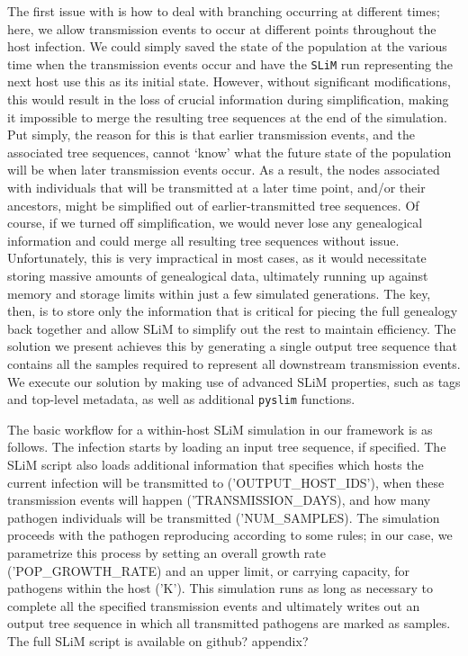 \documentclass[12pt]{article}
\newcommand{\slim}[0]{\texttt{SLiM}\xspace}
\newcommand{\pyslim}[0]{\texttt{pyslim}\xspace}
\begin{document}
The first issue with is how to deal with branching occurring at different times; here, we allow transmission events to occur at different points throughout the host infection.
We could simply saved the state of the population at the various time when the transmission events occur and have the \slim run representing the next host use this
as its initial state. However, without significant modifications, this would result in the loss of crucial information during simplification, making it impossible
to merge the resulting tree sequences at the end of the simulation. Put simply, the reason for this is that earlier transmission events, and
the associated tree sequences, cannot `know' what the future state of the population will be when later transmission events occur. As a result, the nodes associated with
individuals that will be transmitted at a later time point, and/or their ancestors, might be simplified out of earlier-transmitted tree sequences. Of course, if we turned off
simplification, we would never lose any genealogical information and could merge all resulting tree sequences without issue. Unfortunately, this is very impractical in most cases,
as it would necessitate storing massive amounts of genealogical data, ultimately running up against memory and storage limits within just a few simulated generations.
The key, then, is to store only the information that is critical for piecing the full genealogy back together and allow SLiM to simplify out the rest to maintain efficiency. The
solution we present achieves this by generating a single output tree sequence that contains all the samples required to represent all downstream transmission events.
We execute our solution by making use of advanced SLiM properties, such as tags and top-level metadata, as well as additional \pyslim functions.

The basic workflow for a within-host SLiM simulation in our framework is as follows. The infection starts by loading an input tree sequence, if specified. The SLiM script also
loads additional information that specifies which hosts the current infection will be transmitted to ('OUTPUT\_HOST\_IDS'), when these transmission events will happen
('TRANSMISSION\_DAYS), and how many pathogen individuals will be transmitted ('NUM\_SAMPLES). The simulation proceeds with the pathogen reproducing according
to some rules; in our case, we parametrize this process by setting an overall growth rate ('POP\_GROWTH\_RATE) and an upper limit, or carrying capacity, for pathogens
within the host ('K'). This simulation runs as long as necessary to complete all the specified transmission events and ultimately writes out an output tree sequence in which
all transmitted pathogens are marked as samples. The full SLiM script is available on github? appendix?
\end{document}
